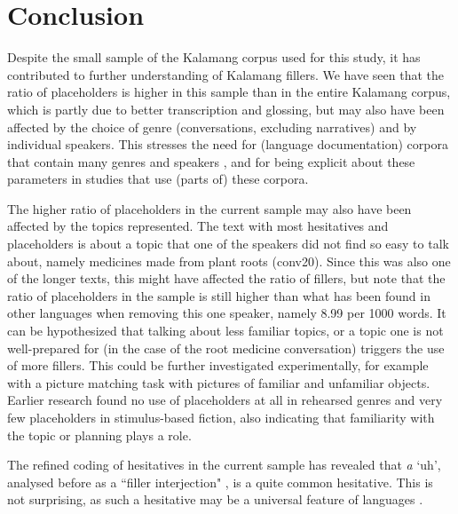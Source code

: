 \documentclass[output=paper,colorlinks,citecolor=brown
\ChapterDOI{10.5281/zenodo.15697587}
]{langscibook}
\begin{document}
\section{Conclusion}
\label{sec:concl}
Despite the small sample of the Kalamang corpus used for this study, it has contributed to further understanding of Kalamang fillers. We have seen that the ratio of placeholders is higher in this sample than in the entire Kalamang corpus, which is partly due to better transcription and glossing, but may also have been affected by the choice of genre (conversations, excluding narratives) and by individual speakers. This stresses the need for (language documentation) corpora that contain many genres and speakers \citep[46--47]{woodbury2003}, and for being explicit about these parameters in studies that use (parts of) these corpora. 

The higher ratio of placeholders in the current sample may also have been affected by the topics represented. The text with most hesitatives and placeholders is about a topic that one of the speakers did not find so easy to talk about, namely medicines made from plant roots (conv20). Since this was also one of the longer texts, this might have affected the ratio of fillers, but note that the ratio of placeholders in the sample is still higher than what has been found in other languages when removing this one speaker, namely 8.99 per 1000 words. It can be hypothesized that talking about less familiar topics, or a topic one is not well-prepared for (in the case of the root medicine conversation) triggers the use of more fillers. This could be further investigated experimentally, for example with a picture matching task with pictures of familiar and unfamiliar objects. Earlier research \citep{rosetalk} found no use of placeholders at all in rehearsed genres and very few placeholders in stimulus-based fiction, also indicating that familiarity with the topic or planning plays a role.

The refined coding of hesitatives in the current sample has revealed that \textit{a} `uh', analysed before as a ``filler interjection" \citep[148]{visser2022}, is a quite common hesitative. This is not surprising, as such a hesitative may be a universal feature of languages \citep{dingemanse2013}. 
\end{document}
